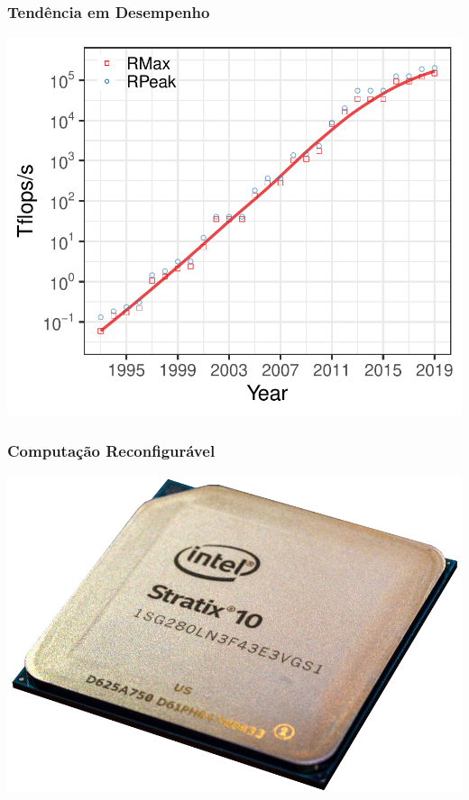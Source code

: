 \documentclass[10pt, compress, aspectratio=169, xcolor={table,usenames,dvipsnames}]{beamer}
\begin{document}
\begin{frame}
    \frametitle{Tendência em Desempenho}
    \begin{center}
        \includegraphics[width=.95\textwidth]{top500_rmax_rpeak}
    \end{center}
\end{frame}

\begin{frame}
    \frametitle{Computação Reconfigurável}
    \begin{center}
        \includegraphics[width=.48\textwidth]{stratix10}
    \end{center}
\end{frame}
\end{document}
